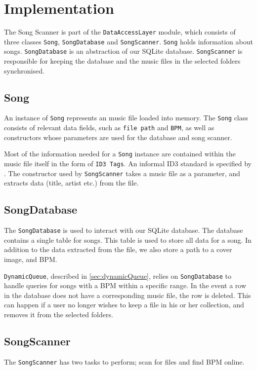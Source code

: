 \section{Implementation}
The Song Scanner is part of the \texttt{DataAccessLayer} module, which consists of three classes \texttt{Song}, \texttt{SongDatabase} and \texttt{SongScanner}. \texttt{Song} holds information about songs. \texttt{SongDatabase} is an abstraction of our SQLite database. \texttt{SongScanner} is responsible for keeping the database and the music files in the selected folders synchronised.

\subsection{Song}
An instance of \texttt{Song} represents an music file loaded into memory. The \texttt{Song} class consists of relevant data fields, such as \texttt{file path} and \texttt{BPM}, as well as constructors whose parameters are used for the database and song scanner. 

Most of the information needed for a \texttt{Song} instance are contained within the music file itself in the form of \texttt{ID3 Tags}. An informal ID3 standard is specified by \citet{ID3:standard}. The constructor used by \texttt{SongScanner} takes a music file as a parameter, and extracts data (title, artist etc.) from the file.

\subsection{SongDatabase}
The \texttt{SongDatabase} is used to interact with our SQLite database. The database contains a single table for songs. This table is used to store all data for a song. In addition to the data extracted from the file, we also store a path to a cover image, and BPM.

\texttt{DynamicQueue}, described in \cref{sec:dynamicQueue}, relies on \texttt{SongDatabase} to handle queries for songs with a BPM within a specific range. In the event a row in the database does not have a corresponding music file, the row is deleted. This can happen if a user no longer wishes to keep a file in his or her collection, and removes it from the selected folders. 

\subsection{SongScanner} 
The \texttt{SongScanner} has two tasks to perform; scan for files and find BPM online.

